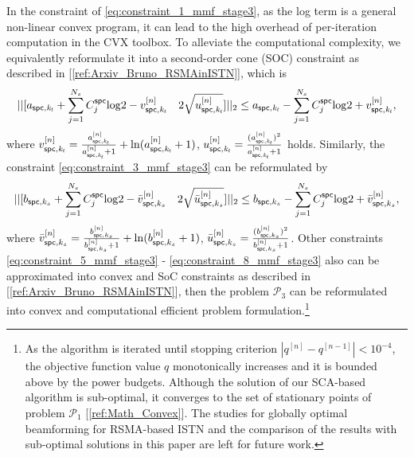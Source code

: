 \documentclass[draftclsnofoot, onecolumn, comsoc, 12pt]{IEEEtran}
\begin{document}
In the constraint of \mbox{\eqref{eq:constraint_1_mmf_stage3}}, as the log term is a general non-linear convex program, it can lead to the high overhead of per-iteration computation in the CVX toolbox. To alleviate the computational complexity, we equivalently reformulate it into a second-order cone (SOC) constraint as described in \mbox{[\ref{ref:Arxiv_Bruno_RSMAinISTN}]}, which is \begin{align}
 ||[a_{\sf{spc},\it{k_{t}}} + \sum_{j=1}^{N_{s}}C^{{\sf spc}}_{j}\mathrm{log}2 - {v}_{\sf{spc},\it{k_{t}}}^{[n]} \quad 2\sqrt{{u}_{\sf{spc},\it{k_{t}}}^{[n]}}]||_{2} 
 \leq a_{\sf{spc},\it{k_{t}}} -  \sum_{j=1}^{N_{s}}C^{\sf{spc}}_{j}\mathrm{log}2 + {v}_{\sf{spc},\it{k_{t}}}^{[n]},
\end{align}
where ${v}_{\sf{spc},\it{k_{t}}}^{[n]} = \frac{a_{\sf{spc},\it{k_{t}}}^{[n]}}{a_{\sf{spc},\it{k_{t}}}^{[n]} + 1} + \mathrm{ln}(a_{\sf{spc},\it{k_{t}}}^{[n]} + 1)$, ${u}_{\sf{spc},\it{k_{t}}}^{[n]} = \frac{(a_{\sf{spc},\it{k_{t}}}^{[n]})^{2}}{a_{\sf{spc},\it{k_{t}}}^{[n]} + 1}$ holds.
Similarly, the constraint \eqref{eq:constraint_3_mmf_stage3} can be reformulated by
\begin{align}
||[b_{{\sf spc}   ,k_{s}} + \sum_{j=1}^{N_{s}}C^{{\sf spc}}_{j}\mathrm{log}2 - \bar{v}_{{\sf spc},k_{s}}^{[n]} \quad 2\sqrt{\bar{u}_{{\sf spc},k_{s}}^{[n]}}]||_{2} 
\leq b_{{\sf spc},k_{s}} -  \sum_{j=1}^{N_{s}}C^{{\sf spc}}_{j}\mathrm{log}2 + \bar{v}_{{\sf spc},k_{s}}^{[n]},
\end{align}
where $\bar{v}_{{\sf spc},k_{s}}^{[n]} = \frac{b_{{\sf spc},k_{s}}^{[n]}}{b_{{\sf spc},k_{s}}^{[n]} + 1} + \mathrm{ln}(b_{{\sf spc},k_{s}}^{[n]} + 1)$, $\bar{u}_{{\sf spc},k_{s}}^{[n]} = \frac{(b_{{\sf spc},k_{s}}^{[n]})^{2}}{b_{{\sf spc},k_{s}}^{[n]} + 1}$.
Other constraints \mbox{\eqref{eq:constraint_5_mmf_stage3}} - \mbox{\eqref{eq:constraint_8_mmf_stage3}} also can be approximated into convex and SoC constraints as described in \mbox{[\ref{ref:Arxiv_Bruno_RSMAinISTN}]}, then the problem $\mathcal{P}_{3}$ can be reformulated into convex and computational efficient problem formulation.\footnote{
As the algorithm is iterated until stopping criterion $|q^{[n]}-q^{[n-1]}|<10^{-4}$, the objective function value $q$ monotonically increases and it is bounded above by the power budgets. Although the solution of our SCA-based algorithm is sub-optimal, it converges to the set of stationary points of problem $\mathcal{P}_{1}$ \mbox{[\ref{ref:Math_Convex}]}. 
The studies for globally optimal beamforming for RSMA-based ISTN and the comparison of the results with sub-optimal solutions in this paper are left for future work.}
\end{document}
